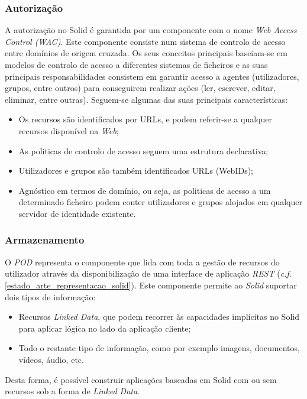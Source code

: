 \subsubsection{Autorização}
A autorização no Solid é garantida por um componente com o nome \emph{Web Access Control (WAC)}. Este componente consiste num sistema de controlo de acesso entre domínios de origem cruzada. Os seus conceitos principais baseiam-se em modelos de controlo de acesso a diferentes sistemas de ficheiros e as suas principais responsabilidades consistem em garantir acesso a agentes (utilizadores, grupos, entre outros) para conseguirem realizar ações (ler, escrever, editar, eliminar, entre outras)\cite{solid_web_access_control}.
Seguem-se algumas das suas principais características:
\begin{itemize}
    \item Os recursos são identificados por URLs, e podem referir-se a qualquer recursos disponível na \emph{Web};
    \item As politicas de controlo de acesso seguem uma estrutura declarativa;
    \item Utilizadores e grupos são também identificados URLs (WebIDs);
    \item Agnóstico em termos de domínio, ou seja, as politicas de acesso a um determinado ficheiro podem conter utilizadores e grupos alojados em qualquer servidor de identidade existente.
\end{itemize}

\subsubsection{Armazenamento \label{subsection_solid_armazenamento}}
O \emph{POD} representa o componente que lida com toda a gestão de recursos do utilizador através da disponibilização de uma interface de aplicação \emph{REST} (\emph{c.f.} \ref{estado_arte_representacao_solid}). Este componente permite ao \emph{Solid} suportar dois tipos de informação:
\begin{itemize}
    \item Recursos \emph{Linked Data}, que podem recorrer às capacidades implícitas no Solid para aplicar lógica no lado da aplicação cliente;
    \item Todo o restante tipo de informação, como por exemplo imagens, documentos, vídeos, áudio, etc.
\end{itemize}

Desta forma, é possível construir aplicações baseadas em Solid com ou sem recursos sob a forma de \emph{Linked Data}\cite{solid_spec}.

